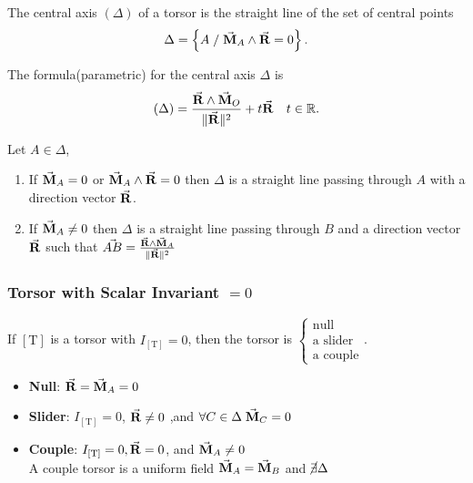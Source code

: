 \documentclass[a4paper,12pt]{article}
\newcommand{\T}{{[\mathrm{T}]}}
\begin{document}
\begin{definition}
	The central axis $(\Delta)$ of a torsor is the straight line of the set of central points
	\[
		\Delta =\left\{ A\;/\;\va{M}_A\land\va{R}=0 \right\}
		.\]
\end{definition}

The formula(parametric) for the central axis $\Delta $ is
\[
	(\Delta ) = \frac{\va{R}\land\va{M}_O}{\|\va{R}\|^2} + t\va{R}\quad t\in\mathbb{R}
	.\]
\begin{remark}
	Let $A\in \Delta$,
	\begin{enumerate}
		\item  If $\va{M}_A=0$ or $\va{M}_A\land\va{R}=0$ then $\Delta $ is a straight line passing through $A$ with a direction vector $\va{R}$.
		\item If $\va{M}_A\neq 0$ then $\Delta $ is a straight line passing through $B$ and a direction vector $\va{R}$ such that $\vec{AB} = \frac{\va{R}\land\va{M}_A}{\|\va{R}\|^2}$
	\end{enumerate}
\end{remark}
\subsubsection{Torsor with Scalar Invariant $=0$}

If $\T$ is a torsor with $I_\T=0$, then the torsor is $\begin{cases}\text{null}\\\text{a slider}\\\text{a couple}\end{cases}$.

\begin{itemize}
	\item \textbf{Null}: $\va{R}=\va{M}_A=0$
	\item \textbf{Slider}: $I_\T=0$, $\va{R}\neq 0$ ,and $\forall C\in\Delta \;\va{M}_C=0$
	\item \textbf{Couple}: $I_\T=0,\va{R}=0$, and $\va{M}_A \neq 0$\\
	      A couple torsor is a uniform field $\va{M}_A=\va{M}_B$ and $\cancel{\exists} \Delta$
\end{itemize}
\end{document}
